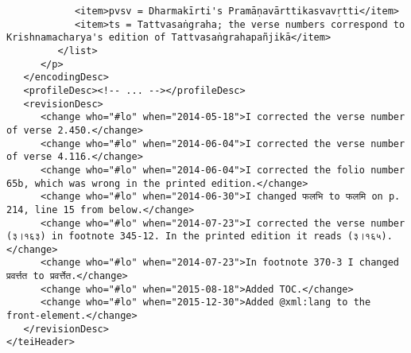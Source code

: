 \documentclass[article,12pt,a4paper]{memoir}
\begin{document}
\begin{verbatim}
            <item>pvsv = Dharmakīrti's Pramāṇavārttikasvavṛtti</item>
            <item>ts = Tattvasaṅgraha; the verse numbers correspond to Krishnamacharya's edition of Tattvasaṅgrahapañjikā</item>
         </list>
      </p>
   </encodingDesc>
   <profileDesc><!-- ... --></profileDesc>
   <revisionDesc>
      <change who="#lo" when="2014-05-18">I corrected the verse number of verse 2.450.</change>
      <change who="#lo" when="2014-06-04">I corrected the verse number of verse 4.116.</change>
      <change who="#lo" when="2014-06-04">I corrected the folio number 65b, which was wrong in the printed edition.</change>
      <change who="#lo" when="2014-06-30">I changed फलभि to फलमि on p. 214, line 15 from below.</change>
      <change who="#lo" when="2014-07-23">I corrected the verse number (३।१६३) in footnote 345-12. In the printed edition it reads (३।१६५).</change>
      <change who="#lo" when="2014-07-23">In footnote 370-3 I changed प्रवर्त्तत to प्रवर्त्तेत.</change>
      <change who="#lo" when="2015-08-18">Added TOC.</change>
      <change who="#lo" when="2015-12-30">Added @xml:lang to the front-element.</change>
   </revisionDesc>
</teiHeader>
	 \end{verbatim}
       
      \clearpage
      \begin{english}
      \nocite{*}
      \printshorthands
      \printbibliography
      \end{english}
    
\end{document}
